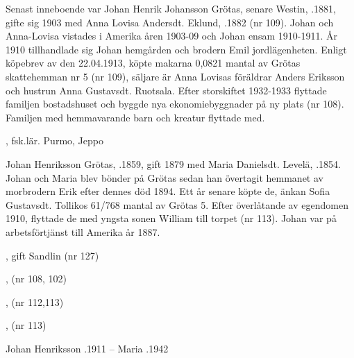 Senast inneboende var Johan Henrik Johansson Grötas, senare Westin, .1881, gifte sig 1903 med Anna Lovisa Andersdt. Eklund, .1882 (nr 109). Johan och Anna-Lovisa vistades i Amerika åren 1903-09 och Johan ensam 1910-1911. År 1910 tillhandlade sig Johan hemgården och  brodern Emil jordlägenheten. Enligt köpebrev av den 22.04.1913, köpte makarna 0,0821 mantal av Grötas skattehemman nr 5 (nr 109), säljare är Anna Lovisas föräldrar Anders Eriksson och hustrun Anna Gustavsdt. Ruotsala. Efter storskiftet 1932-1933 flyttade familjen bostadshuset och byggde nya ekonomiebyggnader på ny plats (nr 108). Familjen med hemmavarande barn och kreatur flyttade med.
\begin{jhchildren}
  \item {}, fsk.lär. Purmo, Jeppo
  \item {}
  \item {}
  \item {}
  \item {}
  \item {}
  \item {}
  \item {}
  \item {}
  \item {}
\end{jhchildren}


Johan Henriksson Grötas, .1859, gift 1879 med Maria Danielsdt. Levelä, .1854. Johan och Maria blev bönder på Grötas sedan han övertagit hemmanet av morbrodern Erik efter dennes död 1894. Ett år senare köpte de, änkan Sofia Gustavsdt. Tollikos 61/768 mantal av Grötas 5.  Efter överlåtande av egendomen 1910, flyttade de med yngsta sonen William till torpet (nr 113). Johan var på arbetsförtjänst till Amerika år 1887.
\begin{jhchildren}
  \item {}, gift Sandlin (nr 127)
  \item {}, (nr 108, 102)
  \item {}, (nr 112,113)
  \item {}
  \item {}, (nr 113)
\end{jhchildren}
Johan Henriksson .1911  --  Maria .1942


